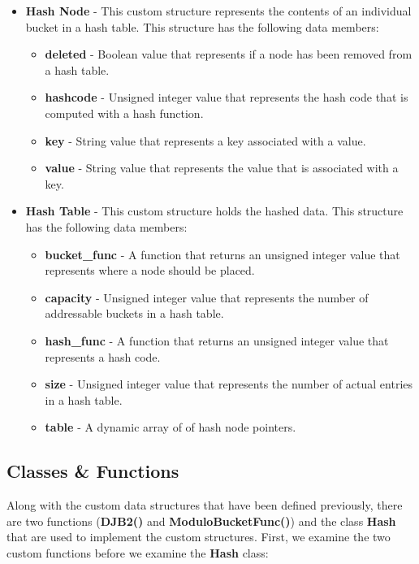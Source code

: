 \documentclass[a4paper,9pt]{article}
\begin{document}
\begin{itemize}
    \item \textbf{Hash Node} - This custom structure represents the contents of an individual bucket in a hash table. This structure has the following data members:
    \begin{itemize}
        \item \textbf{deleted} - Boolean value that represents if a node has been removed from a hash table.
        \item \textbf{hashcode} - Unsigned integer value that represents the hash code that is computed with a hash function.
        \item \textbf{key} - String value that represents a key associated with a value.
        \item \textbf{value} - String value that represents the value that is associated with a key.
    \end{itemize}
    \item \textbf{Hash Table} - This custom structure holds the hashed data. This structure has the following data members:
    \begin{itemize}
        \item \textbf{bucket\_func} - A function that returns an unsigned integer value that represents where a node should be placed.
        \item \textbf{capacity} - Unsigned integer value that represents the number of addressable buckets in a hash table.
        \item \textbf{hash\_func} - A function that returns an unsigned integer value that represents a hash code.
        \item \textbf{size} - Unsigned integer value that represents the number of actual entries in a hash table.
        \item \textbf{table} - A dynamic array of of hash node pointers.
    \end{itemize}
\end{itemize}

\subsection*{Classes \& Functions}

Along with the custom data structures that have been defined previously, there are two functions (\textbf{DJB2()} and \textbf{ModuloBucketFunc()}) and the class \textbf{Hash} that are used to implement 
the custom structures. First, we examine the two custom functions before we examine the \textbf{Hash} class:
\end{document}
